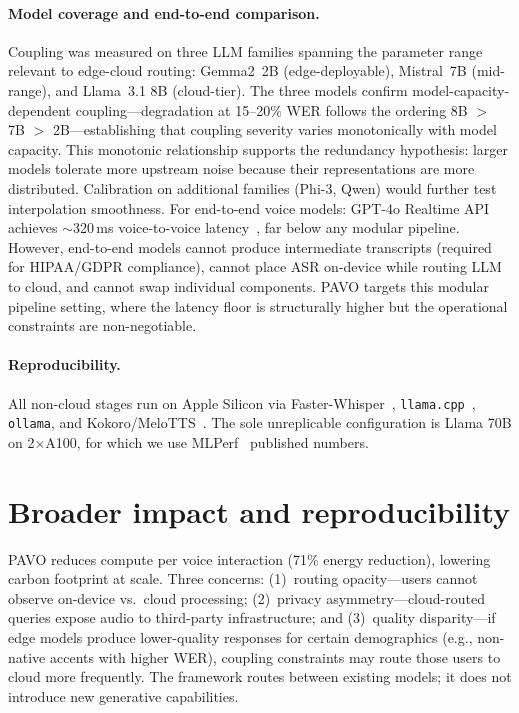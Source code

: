 \documentclass{article}
\begin{document}
\paragraph{Model coverage and end-to-end comparison.} Coupling was measured on three LLM families spanning the parameter range relevant to edge-cloud routing: Gemma2~2B (edge-deployable), Mistral~7B (mid-range), and Llama~3.1 8B (cloud-tier). The three models confirm model-capacity-dependent coupling---degradation at 15--20\% WER follows the ordering 8B $>$ 7B $>$ 2B---establishing that coupling severity varies monotonically with model capacity. This monotonic relationship supports the redundancy hypothesis: larger models tolerate more upstream noise because their representations are more distributed. Calibration on additional families (Phi-3, Qwen) would further test interpolation smoothness. For end-to-end voice models: GPT-4o Realtime API achieves $\sim$320\,ms voice-to-voice latency~\citep{openai2024gpt4o}, far below any modular pipeline. However, end-to-end models cannot produce intermediate transcripts (required for HIPAA/GDPR compliance), cannot place ASR on-device while routing LLM to cloud, and cannot swap individual components. PAVO targets this modular pipeline setting, where the latency floor is structurally higher but the operational constraints are non-negotiable.

\paragraph{Reproducibility.}
\label{sec:macbook}
All non-cloud stages run on Apple Silicon via Faster-Whisper~\citep{radford2023whisper}, \texttt{llama.cpp}~\citep{dubey2024llama3,frantar2022gptq}, \texttt{ollama}, and Kokoro/MeloTTS~\citep{kong2020hifigan,casanova2022yourtts}. The sole unreplicable configuration is Llama 70B on 2$\times$A100, for which we use MLPerf~\citep{mlperf2025} published numbers.

\section{Broader impact and reproducibility}
\label{sec:broader_impact}
\label{sec:reproducibility}
\label{sec:scope}

PAVO reduces compute per voice interaction (71\% energy reduction), lowering carbon footprint at scale. Three concerns: (1)~routing opacity---users cannot observe on-device vs.\ cloud processing; (2)~privacy asymmetry---cloud-routed queries expose audio to third-party infrastructure; and (3)~quality disparity---if edge models produce lower-quality responses for certain demographics (e.g., non-native accents with higher WER), coupling constraints may route those users to cloud more frequently. The framework routes between existing models; it does not introduce new generative capabilities.
\end{document}
